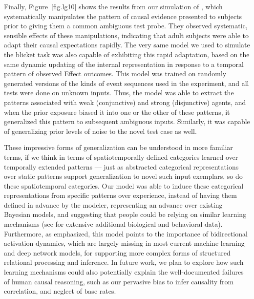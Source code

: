 \documentclass[11pt,twoside]{article}
\newif\myifpdf
\begin{document}
Finally, Figure~\ref{fig.lg10} shows the results from our simulation of \cite{LucasGriffiths10}, which systematically manipulates the pattern of causal evidence presented to subjects prior to giving them a common ambiguous test probe.  They observed systematic, sensible effects of these manipulations, indicating that adult subjects were able to adapt their causal expectations rapidly.  The very same model we used to simulate the blicket task was also capable of exhibiting this rapid adaptation, based on the same dynamic updating of the internal representation in response to a temporal pattern of observed Effect outcomes.  This model was trained on randomly generated versions of the kinds of event sequences used in the experiment, and all tests were done on unknown inputs.  Thus, the model was able to extract the patterns associated with weak (conjunctive) and strong (disjunctive) agents, and when the prior exposure biased it into one or the other of these patterns, it generalized this pattern to subsequent ambiguous inputs.  Similarly, it was capable of generalizing prior levels of noise to the novel test case as well.

These impressive forms of generalization can be understood in more familiar terms, if we think in terms of spatiotemporally defined categories learned over temporally extended patterns --- just as abstracted categorical representations over static patterns support generalization to novel such input exemplars, so do these spatiotemporal categories.  Our model was able to induce these categorical representations from specific patterns over experience, instead of having them defined in advance by the modeler, representing an advance over existing Bayesian models, and suggesting that people could be relying on similar learning mechanisms (see \cite{OReillyWyatteRohrlichIP} for extensive additional biological and behavioral data).  Furthermore, as emphasized, this model points to the importance of bidirectional activation dynamics, which are largely missing in most current machine learning and deep network models, for supporting more complex forms of structured relational processing and inference.  In future work, we plan to explore how such learning mechanisms could also potentially explain the well-documented failures of human causal reasoning, such as our pervasive bias to infer causality from correlation, and neglect of base rates.


%
\end{document}
